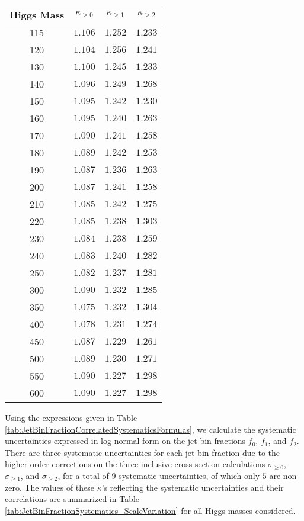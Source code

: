 \begin{table}[!htbp]
\begin{center}
\begin{tabular}{|c|c|c|c|}

\hline
Higgs Mass     &     $\kappa_{\geq 0}$        &   $\kappa_{\geq 1}$        &     $\kappa_{\geq 2}$       \\
\hline
 115 & $ 1.106$  & $ 1.252$  & $ 1.233$  \\
 120 & $ 1.104$  & $ 1.256$  & $ 1.241$  \\
 130 & $ 1.100$  & $ 1.245$  & $ 1.233$  \\
 140 & $ 1.096$  & $ 1.249$  & $ 1.268$  \\
 150 & $ 1.095$  & $ 1.242$  & $ 1.230$  \\
 160 & $ 1.095$  & $ 1.240$  & $ 1.263$  \\
 170 & $ 1.090$  & $ 1.241$  & $ 1.258$  \\
 180 & $ 1.089$  & $ 1.242$  & $ 1.253$  \\
 190 & $ 1.087$  & $ 1.236$  & $ 1.263$  \\
 200 & $ 1.087$  & $ 1.241$  & $ 1.258$  \\
 210 & $ 1.085$  & $ 1.242$  & $ 1.275$  \\
 220 & $ 1.085$  & $ 1.238$  & $ 1.303$  \\
 230 & $ 1.084$  & $ 1.238$  & $ 1.259$  \\
 240 & $ 1.083$  & $ 1.240$  & $ 1.282$  \\
 250 & $ 1.082$  & $ 1.237$  & $ 1.281$  \\
 300 & $ 1.090$  & $ 1.232$  & $ 1.285$  \\
 350 & $ 1.075$  & $ 1.232$  & $ 1.304$  \\
 400 & $ 1.078$  & $ 1.231$  & $ 1.274$  \\
 450 & $ 1.087$  & $ 1.229$  & $ 1.261$  \\
 500 & $ 1.089$  & $ 1.230$  & $ 1.271$  \\
 550 & $ 1.090$  & $ 1.227$  & $ 1.298$  \\
 600 & $ 1.090$  & $ 1.227$  & $ 1.298$  \\
\hline
\end{tabular}
\caption{  }
\label{tab:InclXS_ScaleVariation}
\end{center}
\end{table}




Using the expressions given in Table \ref{tab:JetBinFractionCorrelatedSystematicsFormulas}, we calculate 
the systematic uncertainties expressed in log-normal form on the jet bin fractions $f_{0}$, $f_{1}$, 
and $f_{2}$. There are three systematic uncertainties for each jet bin fraction due to the higher order
corrections on the three inclusive cross section calculations $\sigma_{\geq 0}$, $\sigma_{\geq 1}$, 
and $\sigma_{\geq 2}$, for a total of $9$ systematic uncertainties, of which only $5$ are non-zero.
The values of these $\kappa$'s reflecting the systematic uncertainties and their correlations are 
summarized in Table \ref{tab:JetBinFractionSystematics_ScaleVariation} for all Higgs masses considered.


